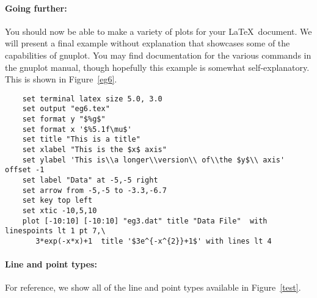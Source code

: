 
\paragraph{Going further:} You should now be able to make a variety of
plots for your \LaTeX\ document. We will present a final example
without explanation that showcases some of the capabilities of
gnuplot. You may find documentation for the various commands in the
gnuplot manual, though hopefully this example is somewhat
self-explanatory. This is shown in Figure~\ref{eg6}.

\singlespace
\begin{verbatim}
    set terminal latex size 5.0, 3.0
    set output "eg6.tex"
    set format y "$%g$"
    set format x '$%5.1f\mu$'
    set title "This is a title"
    set xlabel "This is the $x$ axis" 
    set ylabel 'This is\\a longer\\version\\ of\\the $y$\\ axis' offset -1
    set label "Data" at -5,-5 right
    set arrow from -5,-5 to -3.3,-6.7
    set key top left
    set xtic -10,5,10
    plot [-10:10] [-10:10] "eg3.dat" title "Data File"  with linespoints lt 1 pt 7,\
       3*exp(-x*x)+1  title '$3e^{-x^{2}}+1$' with lines lt 4
\end{verbatim}
\currentspace


\paragraph{Line and point types:} For reference, we show all of the
line and point types available in Figure~\ref{test}.


